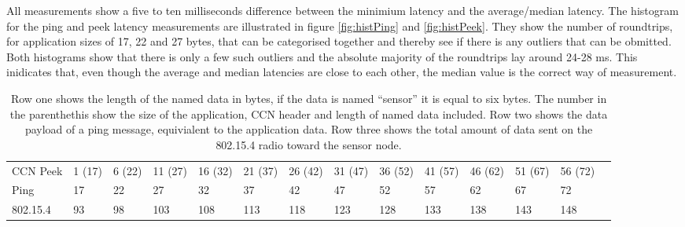 All measurements show a five to ten milliseconds difference between the minimium latency and the average/median latency. The histogram for the ping and peek latency measurements are illustrated in figure \ref{fig:histPing} and \ref{fig:histPeek}. They show the number of roundtrips, for application sizes of 17, 22 and 27 bytes, that can be categorised together and thereby see if there is any outliers that can be obmitted. Both histograms show that there is only a few such outliers and the absolute majority of the roundtrips lay around 24-28 ms. This inidicates that, even though the average and median latencies are close to each other, the median value is the correct way of measurement.










\begin{table}[]
\centering
\resizebox{\textwidth}{!}
{%
\begin{tabular}{|l|l|l|l|l|l|l|l|l|l|l|l|l|l}
\cline{1-13}
CCN Peek & 1 (17) & 6 (22) & 11 (27) & 16 (32) & 21 (37) & 26 (42) & 31 (47) & 36 (52) & 41 (57) & 46 (62) & 51 (67) & 56 (72) &  \\ \cline{1-13}
Ping     & 17     & 22     & 27      & 32      & 37      & 42      & 47      & 52      & 57      & 62      & 67      & 72      &  \\ \cline{1-13}
802.15.4 & 93     & 98     & 103     & 108     & 113     & 118     & 123     & 128     & 133     & 138     & 143     & 148     &  \\ \cline{1-13}
\end{tabular}
}
\caption{Row one shows the length of the named data in bytes, if the data is named ``sensor'' it is equal to six bytes. The number in the parenthethis show the size of the application, CCN header and length of named data included. Row two shows the data payload of a ping message, equivialent to the application data. Row three shows the total amount of data sent on the 802.15.4 radio toward the sensor node.}

\label{tab:packetSizes}
\end{table}




